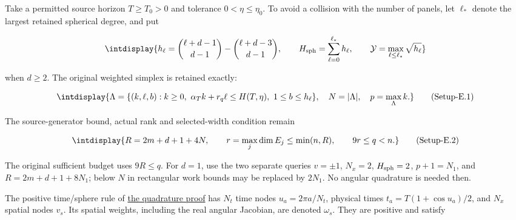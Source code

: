 
Take a permitted source horizon \(T\ge T_0>0\) and tolerance \(0<\eta\le\eta_0\). To avoid a collision with the number of panels, let \(\ell_*\) denote the largest retained spherical degree, and put


\begingroup\renewcommand{\theHequation}{intdisplay.999}
\begin{equation*}
\intdisplay{
h_\ell=\binom{\ell+d-1}{d-1}-\binom{\ell+d-3}{d-1},\qquad
H_{\rm sph}=\sum_{\ell=0}^{\ell_*}h_\ell,\qquad
\mathcal Y=\max_{\ell\le\ell_*}\sqrt{h_\ell}
}
\end{equation*}
\endgroup


when \(d\ge2\). The original weighted simplex is retained exactly:


\label{int:eq-setup-e-1}
\begingroup\renewcommand{\theHequation}{intdisplay.1000}
\begin{equation}
\intdisplay{
\Lambda=\{(k,\ell,b):k\ge0,\ \alpha_Tk+r_q\ell\le H(T,\eta),
                   \ 1\le b\le h_\ell\},
\quad N=|\Lambda|,\quad p=\max_\Lambda k.
}
\tag{Setup-E.1}
\label{int:eq-0516-setup-e-1}
\end{equation}
\endgroup


The source-generator bound, actual rank and selected-width condition remain


\label{int:eq-setup-e-2}
\begingroup\renewcommand{\theHequation}{intdisplay.1001}
\begin{equation}
\intdisplay{
R=2m+d+1+4N,\qquad r=\max_j\dim E_j\le\min(n,R),
\qquad 9r\le q<n.
}
\tag{Setup-E.2}
\label{int:eq-0517-setup-e-2}
\end{equation}
\endgroup


The original sufficient budget uses \(9R\le q\). For \(d=1\), use the two separate queries \(v=\pm1\), \(N_x=2\), \(H_{\rm sph}=2\), \(p+1=N_1\), and \(R=2m+d+1+8N_1\); below \(N\) in rectangular work bounds may be replaced by \(2N_1\). No angular quadrature is needed then.



The positive time/sphere rule of \hyperref[int:setup-quadrature]{the quadrature proof} has \(N_t\) time nodes \(u_a=2\pi a/N_t\), physical times \(t_a=T(1+\cos u_a)/2\), and \(N_x\) spatial nodes \(v_s\). Its spatial weights, including the real angular Jacobian, are denoted \(\omega_s\). They are positive and satisfy


